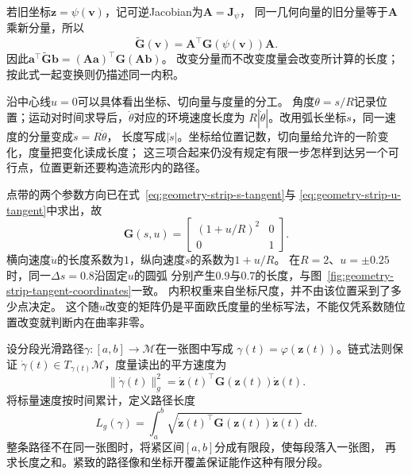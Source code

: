 若旧坐标$\bm z=\psi(\bm v)$，记可逆Jacobian为$\bm A=\bm J_\psi$，
同一几何向量的旧分量等于$\bm A$乘新分量，所以
\begin{equation}
 \widetilde{\bm G}(\bm v)=
 \bm A^\top\bm G(\psi(\bm v))\bm A.
 \label{eq:geometry-metric-coordinate-transform}
\end{equation}
因此$\bm a^\top\widetilde{\bm G}\bm b
=(\bm A\bm a)^\top\bm G(\bm A\bm b)$。
改变分量而不改变度量会改变所计算的长度；按此式一起变换则仍描述同一内积。

沿中心线$u=0$可以具体看出坐标、切向量与度量的分工。
角度$\theta=s/R$记录位置；运动对时间求导后，$\dot\theta$对应的环境速度长度为
$R|\dot\theta|$。改用弧长坐标$s$，同一速度的分量变成$\dot s=R\dot\theta$，
长度写成$|\dot s|$。坐标给位置记数，切向量给允许的一阶变化，度量把变化读成长度；
这三项合起来仍没有规定有限一步怎样到达另一个可行点，位置更新还要构造流形内的路径。

点带的两个参数方向已在式~\eqref{eq:geometry-strip-s-tangent}与
\eqref{eq:geometry-strip-u-tangent}中求出，故
\begin{equation}
 \bm G(s,u)=
 \begin{bmatrix}(1+u/R)^2&0\\0&1\end{bmatrix}.
 \label{eq:geometry-strip-metric}
\end{equation}
横向速度$\dot u$的长度系数为$1$，纵向速度$\dot s$的系数为$1+u/R$。
在$R=2$、$u=\pm0.25$时，同一$\Delta s=0.8$沿固定$u$的圆弧
分别产生$0.9$与$0.7$的长度，与图~\ref{fig:geometry-strip-tangent-coordinates}一致。
内积权重来自坐标尺度，并不由该位置采到了多少点决定。
这个随$u$改变的矩阵仍是平面欧氏度量的坐标写法，不能仅凭系数随位置改变就判断内在曲率非零。


设分段光滑路径$\gamma:[a,b]\to\mathcal M$在一张图中写成
$\gamma(t)=\varphi(\bm z(t))$。链式法则保证
$\dot\gamma(t)\in T_{\gamma(t)}\mathcal M$，度量读出的平方速度为
\begin{equation}
 \lVert\dot\gamma(t)\rVert_g^2
 =\dot{\bm z}(t)^\top\bm G(\bm z(t))\dot{\bm z}(t).
 \label{eq:geometry-riemannian-speed}
\end{equation}
将标量速度按时间累计，定义路径长度
\begin{equation}
 L_g(\gamma)=\int_a^b
 \sqrt{\dot{\bm z}(t)^\top\bm G(\bm z(t))\dot{\bm z}(t)}\,\mathrm dt.
 \label{eq:geometry-riemannian-curve-length}
\end{equation}
整条路径不在同一张图时，将紧区间$[a,b]$分成有限段，使每段落入一张图，
再求长度之和。紧致的路径像和坐标开覆盖保证能作这种有限分段。


